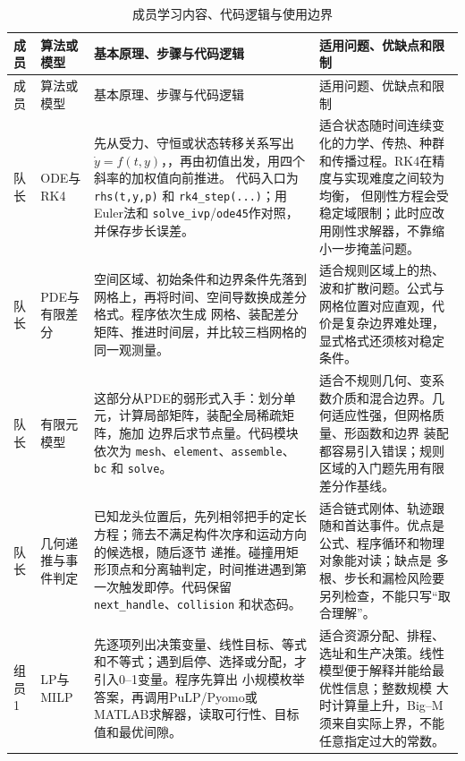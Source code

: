 \documentclass[UTF8,zihao=-4]{ctexart}
\begin{document}
\setlength{\tabcolsep}{2.5pt}
\small
\begin{longtable}{p{1.25cm}p{2.55cm}p{6.25cm}p{5.45cm}}
\caption{成员学习内容、代码逻辑与使用边界}\label{tab:learning-units}\\
\toprule
成员 & 算法或模型 & 基本原理、步骤与代码逻辑 & 适用问题、优缺点和限制\\
\midrule
\endfirsthead
\toprule
成员 & 算法或模型 & 基本原理、步骤与代码逻辑 & 适用问题、优缺点和限制\\
\midrule
\endhead
\bottomrule
\endfoot

队长 & ODE与RK4
& 先从受力、守恒或状态转移关系写出 $\dot{y}=f(t,y)$，，再由初值出发，用四个斜率的加权值向前推进。
代码入口为 \texttt{rhs(t,y,p)} 和 \texttt{rk4\_step(...)}；用Euler法和
\texttt{solve\_ivp}/\texttt{ode45}作对照，并保存步长误差。
& 适合状态随时间连续变化的力学、传热、种群和传播过程。RK4在精度与实现难度之间较为均衡，
但刚性方程会受稳定域限制；此时应改用刚性求解器，不靠缩小一步掩盖问题。\\

队长 & PDE与有限差分
& 空间区域、初始条件和边界条件先落到网格上，再将时间、空间导数换成差分格式。程序依次生成
网格、装配差分矩阵、推进时间层，并比较三档网格的同一观测量。
& 适合规则区域上的热、波和扩散问题。公式与网格位置对应直观，代价是复杂边界难处理，
显式格式还须核对稳定条件。\\

队长 & 有限元模型
& 这部分从PDE的弱形式入手：划分单元，计算局部矩阵，装配全局稀疏矩阵，施加
边界后求节点量。代码模块依次为 \texttt{mesh}、\texttt{element}、\texttt{assemble}、
\texttt{bc} 和 \texttt{solve}。
& 适合不规则几何、变系数介质和混合边界。几何适应性强，但网格质量、形函数和边界
装配都容易引入错误；规则区域的入门题先用有限差分作基线。\\

队长 & 几何递推与事件判定
& 已知龙头位置后，先列相邻把手的定长方程；筛去不满足构件次序和运动方向的候选根，随后逐节
递推。碰撞用矩形顶点和分离轴判定，时间推进遇到第一次触发即停。代码保留
\texttt{next\_handle}、\texttt{collision} 和状态码。
& 适合链式刚体、轨迹跟随和首达事件。优点是公式、程序循环和物理对象能对读；缺点是
多根、步长和漏检风险要另列检查，不能只写“取合理解”。\\

组员1 & LP与MILP
& 先逐项列出决策变量、线性目标、等式和不等式；遇到启停、选择或分配，才引入0--1变量。程序先算出
小规模枚举答案，再调用PuLP/Pyomo或MATLAB求解器，读取可行性、目标值和最优间隙。
& 适合资源分配、排程、选址和生产决策。线性模型便于解释并能给最优性信息；整数规模
大时计算量上升，Big--M须来自实际上界，不能任意指定过大的常数。\\


\end{longtable}
\end{document}
